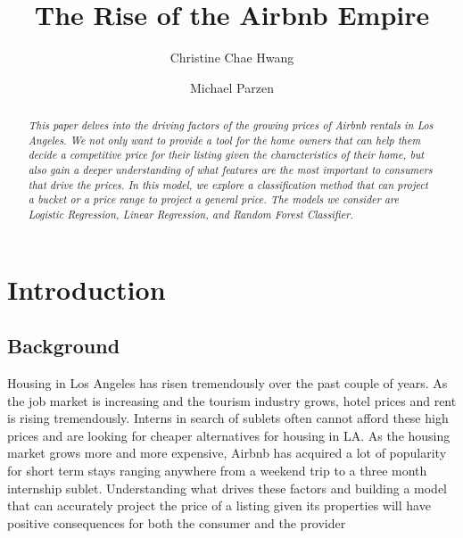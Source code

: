 \documentclass[twocolumn,10pt]{asme2ej}
\title{The Rise of the Airbnb Empire}
\author{Christine Chae Hwang
    \affiliation{
	Senior, Statistics Department
	Harvard University\\
	Class of 2017\\
    Email: chaehwang@college.harvard.edu
    }	
}
\author{Michael Parzen
    \affiliation{
    	Advisor
	Statistics Department
	Harvard University\\
    }	
}
\begin{document}
\maketitle    

\begin{abstract}
{\it 
This paper delves into the driving factors of the growing prices of Airbnb rentals in Los Angeles. We not only want to provide a tool for the home owners that can help them decide a competitive price for their listing given the characteristics of their home, but also gain a deeper understanding of what features are the most important to consumers that drive the prices. In this model, we explore a classification method that can project a bucket or a price range to project a general price. The models we consider are Logistic Regression, Linear Regression, and Random Forest Classifier.
}
\end{abstract}

\section{Introduction}
\subsection{Background}
Housing in Los Angeles has risen tremendously over the past couple of years. As the job market is increasing and the tourism industry grows, hotel prices and rent is rising tremendously. Interns in search of sublets often cannot afford these high prices and are looking for cheaper alternatives for housing in LA. As the housing market grows more and more expensive, Airbnb has acquired a lot of popularity for short term stays ranging anywhere from a weekend trip to a three month internship sublet. Understanding what drives these factors and building a model that can accurately project the price of a listing given its properties will have positive consequences for both the consumer and the provider
\end{document}
